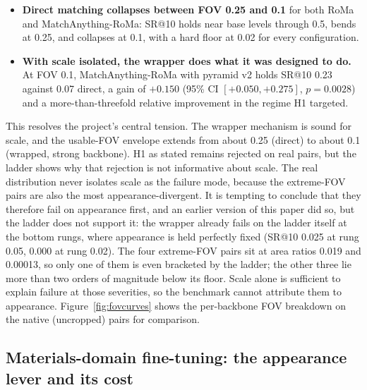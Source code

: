 \documentclass[fleqn,10pt]{wlscirep}
\begin{document}
\begin{itemize}
  \item \textbf{Direct matching collapses between FOV 0.25 and 0.1} for both RoMa and MatchAnything-RoMa: SR@10 holds near base levels through 0.5, bends at 0.25, and collapses at 0.1, with a hard floor at 0.02 for every configuration.
  \item \textbf{With scale isolated, the wrapper does what it was designed to do.} At FOV 0.1, MatchAnything-RoMa with pyramid v2 holds SR@10 0.23 against 0.07 direct, a gain of $+0.150$ (95\% CI $[+0.050,+0.275]$, $p=0.0028$) and a more-than-threefold relative improvement in the regime H1 targeted.
\end{itemize}

This resolves the project's central tension. The wrapper mechanism is sound for scale, and the usable-FOV envelope extends from about 0.25 (direct) to about 0.1 (wrapped, strong backbone). H1 as stated remains rejected on real pairs, but the ladder shows why that rejection is not informative about scale. The real distribution never isolates scale as the failure mode, because the extreme-FOV pairs are also the most appearance-divergent. It is tempting to conclude that they therefore fail on appearance first, and an earlier version of this paper did so, but the ladder does not support it: the wrapper already fails on the ladder itself at the bottom rungs, where appearance is held perfectly fixed (SR@10 0.025 at rung 0.05, 0.000 at rung 0.02). The four extreme-FOV pairs sit at area ratios 0.019 and 0.00013, so only one of them is even bracketed by the ladder; the other three lie more than two orders of magnitude below its floor. Scale alone is sufficient to explain failure at those severities, so the benchmark cannot attribute them to appearance. Figure~\ref{fig:fovcurves} shows the per-backbone FOV breakdown on the native (uncropped) pairs for comparison.

\subsection*{Materials-domain fine-tuning: the appearance lever and its cost}
\end{document}
